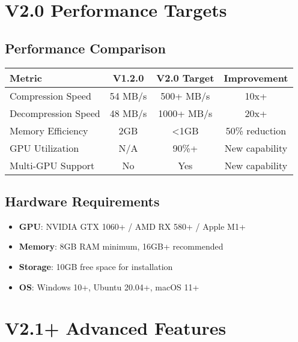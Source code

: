\documentclass[12pt,a4paper]{article}
\begin{document}
\section{V2.0 Performance Targets}

\subsection{Performance Comparison}
\begin{center}
\begin{tabular}{|l|c|c|c|}
\hline
\textbf{Metric} & \textbf{V1.2.0} & \textbf{V2.0 Target} & \textbf{Improvement} \\
\hline
Compression Speed & 54 MB/s & 500+ MB/s & 10x+ \\
Decompression Speed & 48 MB/s & 1000+ MB/s & 20x+ \\
Memory Efficiency & 2GB & <1GB & 50\% reduction \\
GPU Utilization & N/A & 90\%+ & New capability \\
Multi-GPU Support & No & Yes & New capability \\
\hline
\end{tabular}
\end{center}

\subsection{Hardware Requirements}
\begin{itemize}
    \item \textbf{GPU}: NVIDIA GTX 1060+ / AMD RX 580+ / Apple M1+
    \item \textbf{Memory}: 8GB RAM minimum, 16GB+ recommended
    \item \textbf{Storage}: 10GB free space for installation
    \item \textbf{OS}: Windows 10+, Ubuntu 20.04+, macOS 11+
\end{itemize}

\section{V2.1+ Advanced Features}
\end{document}
